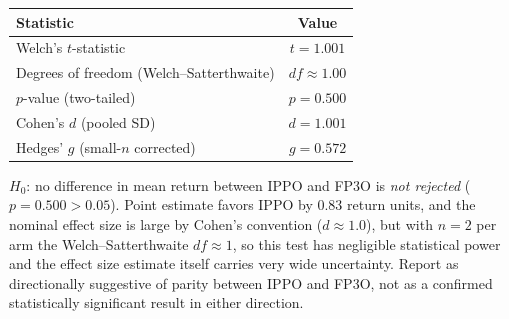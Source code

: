 \begin{table}[htbp]
\begin{threeparttable}
\begin{tabular}{lc}
\toprule
\textbf{Statistic} & \textbf{Value} \\
\midrule
Welch's $t$-statistic                      & $t = 1.001$ \\
Degrees of freedom (Welch--Satterthwaite)  & $df \approx 1.00$ \\
$p$-value (two-tailed)                     & $p = 0.500$ \\
Cohen's $d$ (pooled SD)                    & $d = 1.001$ \\
Hedges' $g$ (small-$n$ corrected)          & $g = 0.572$ \\
\bottomrule
\end{tabular}
\begin{tablenotes}
\footnotesize
\item $H_0$: no difference in mean return between IPPO and FP3O is \emph{not
rejected} ($p = 0.500 > 0.05$). Point estimate favors IPPO by 0.83 return
units, and the nominal effect size is large by Cohen's convention
($d \approx 1.0$), but with $n=2$ per arm the Welch--Satterthwaite
$df \approx 1$, so this test has negligible statistical power and the effect
size estimate itself carries very wide uncertainty. Report as directionally
suggestive of parity between IPPO and FP3O, not as a confirmed statistically
significant result in either direction.
\end{tablenotes}
\end{threeparttable}

\end{table}
